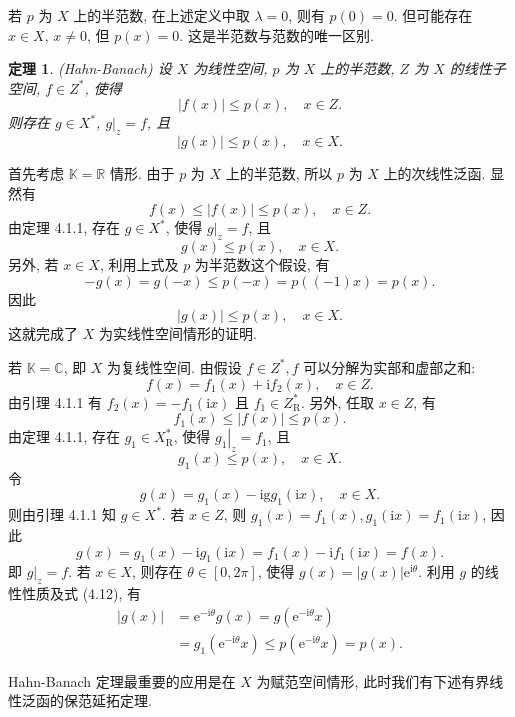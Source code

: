 \documentclass[openany]{ctexbook}
\makeatletter
\theoremstyle{kaiti}
\newtheorem{theorem}{定理}[section]
\theoremstyle{normal}
\renewenvironment{proof}[1][\proofname]{\par
    \pushQED{\qed}%
    \normalfont \topsep6\p@\@plus6\p@\relax
    \trivlist
    \item\relax
    {\heiti #1}\hspace{2\labelsep}\ignorespaces
  }{%
    \popQED\endtrivlist\@endpefalse
  }
\makeatother
\begin{document}
若 $p$ 为 $X$ 上的半范数, 在上述定义中取 $\lambda=0$, 则有 $p(0)=0$. 但可能存在 $x \in X$, $x \neq 0$, 但 $p(x)=0$. 这是半范数与范数的唯一区别.

\begin{theorem}
(Hahn-Banach) 设 $X$ 为线性空间, $p$ 为 $X$ 上的半范数, $Z$ 为 $X$ 的线性子空间, $f \in Z^{*}$, 使得
$$
|f(x)| \leqslant p(x), \quad x \in Z.
$$
则存在 $g \in X^{*}$, $g|_{z}=f$, 且
$$
|g(x)| \leqslant p(x), \quad x \in X.
$$
\end{theorem}

\begin{proof}
首先考虑 $\mathbb{K}=\mathbb{R}$ 情形. 由于 $p$ 为 $X$ 上的半范数, 所以 $p$ 为 $X$ 上的次线性泛函. 显然有
$$
f(x) \leqslant|f(x)| \leqslant p(x), \quad x \in Z.
$$
由定理 4.1.1, 存在 $g \in X^{*}$, 使得 $g|_{z}=f$, 且
$$
g(x) \leqslant p(x), \quad x \in X.
$$
另外, 若 $x \in X$, 利用上式及 $p$ 为半范数这个假设, 有
$$
-g(x)=g(-x) \leqslant p(-x)=p((-1) x)=p(x).
$$
因此
$$
|g(x)| \leqslant p(x), \quad x \in X.
$$
这就完成了 $X$ 为实线性空间情形的证明.

若 $\mathbb{K}=\mathbb{C}$, 即 $X$ 为复线性空间. 由假设 $f \in Z^{*}, f$ 可以分解为实部和虚部之和:
$$
f(x)=f_1(x)+\mathrm{i} f_2(x), \quad x \in Z.
$$
由引理 4.1.1 有 $f_2(x)=-f_1(\mathrm{i} x)$ 且 $f_1 \in Z_{\mathrm{R}}^{*}$. 另外, 任取 $x \in Z$, 有
$$
f_1(x) \leqslant|f(x)| \leqslant p(x).
$$
由定理 4.1.1, 存在 $g_1 \in X_{\mathrm{R}}^{*}$, 使得 $\left.g_1\right|_{z}=f_1$, 且
\begin{equation}
  g_1(x) \leqslant p(x), \quad x \in X.
\end{equation}
令
$$
g(x)=g_1(x)-\mathrm{ig} g_1(\mathrm{i} x), \quad x \in X.
$$
则由引理 4.1.1 知 $g \in X^{*}$. 若 $x \in Z$, 则 $g_1(x)=f_1(x), g_1(\mathrm{i} x)=f_1(\mathrm{i} x)$, 因此
$$
g(x)=g_1(x)-\mathrm{i} g_1(\mathrm{i} x)=f_1(x)-\mathrm{i} f_1(\mathrm{i} x)=f(x).
$$
即 $\left.g\right|_{z}=f$. 若 $x \in X$, 则存在 $\theta \in[0,2 \pi]$, 使得 $g(x)=|g(x)| \mathrm{e}^{\mathrm{i} \theta}$. 利用 $g$ 的线性性质及式 (4.12), 有
$$
\begin{aligned}
|g(x)| &=\mathrm{e}^{-\mathrm{i} \theta} g(x)=g\left(\mathrm{e}^{-\mathrm{i} \theta} x\right) \\
&=g_1\left(\mathrm{e}^{-\mathrm{i} \theta} x\right) \leqslant p\left(\mathrm{e}^{-\mathrm{i} \theta} x\right)=p(x).
\end{aligned}
$$
\end{proof}

Hahn-Banach 定理最重要的应用是在 $X$ 为赋范空间情形, 此时我们有下述有界线性泛函的保范延拓定理.
\end{document}
